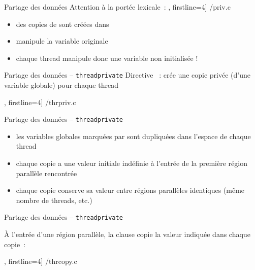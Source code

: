 \begin {frame} [fragile] {Partage des données}
    Attention à la portée lexicale~:
    \scriptsize\lstmonstyle, firstline=4] {\inc/priv.c}

    \begin {itemize}
	\item des copies de  sont créées dans 
	\item {} manipule la variable  originale
	\item chaque thread manipule donc une variable  non
	    initialisée !
    \end {itemize}
\end{frame}

\begin {frame} [fragile] {Partage des données -- \texttt {threadprivate}}
    Directive ~: crée une copie
    privée (d'une variable globale) pour chaque thread

    \scriptsize\lstmonstyle, firstline=4] {\inc/thrpriv.c} 
\end{frame}

\begin {frame} {Partage des données -- \texttt {threadprivate}}
    \begin {itemize}
	\item les variables globales marquées par 
	    sont dupliquées dans l'espace de chaque thread

	\item chaque copie a une valeur initiale indéfinie à l'entrée
	    de la première région parallèle rencontrée

	\item chaque copie conserve sa valeur entre régions
	    parallèles identiques (même nombre de threads, etc.)

    \end {itemize}
\end {frame}

\begin {frame} [fragile] {Partage des données -- \texttt {threadprivate}}

    À l'entrée d'une région parallèle, la clause 
    copie la valeur indiquée dans chaque copie~:

    \scriptsize\lstmonstyle, firstline=4] {\inc/thrcopy.c}

\end{frame}

